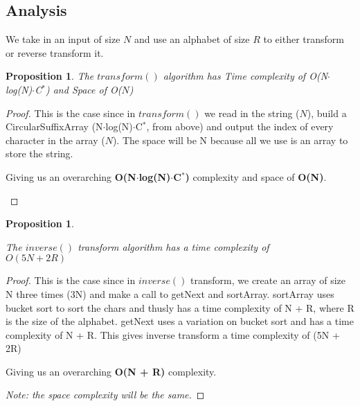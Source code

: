 \documentclass[12pt]{article}
\newtheorem{proposition}[theorem]{Proposition}
\begin{document}
\subsection{Analysis}

We take in an input of size $N$ and use an alphabet of size $R$ to either
transform or reverse transform it.

\begin{proposition}
	\label{numq}
	The $transform()$ algorithm has Time complexity of O(N$\cdot$log(N)$\cdot$C$^{\ast}$) and Space of O($N$)
	
	
\end{proposition}

\begin{proof}
	This is the case since in $transform()$ we read in the string ($N$), build a CircularSuffixArray (N$\cdot$log(N)$\cdot$C$^{\ast}$, from above) and output the index of every character in the array ($N$).
	The space will be N because all we use is an array to store the string. 
	
	
	\begin{center}
		Giving us an overarching \textbf{O(N$\cdot$log(N)$\cdot$C$^{\ast}$)} complexity and space of \textbf{O(N)}.
	\end{center}
	
\end{proof}

\begin{proposition}
	\label{numq}
	
	The $inverse()$ transform algorithm has a time complexity of \\ $O(5N + 2R)$
	
	
\end{proposition}

\begin{proof}
	This is the case since in $inverse()$ transform, we create an array of size N three times (3N) and make a call to getNext and sortArray. sortArray uses
	bucket sort to sort the chars and thusly has a time complexity of N + R,
	where R is the size of the alphabet. getNext uses a variation on bucket
	sort and has a time complexity of N + R. This gives inverse transform
	a time complexity of (5N + 2R)
	
	
	\begin{center}
		Giving us an overarching \textbf{O(N + R)} complexity.
		
		
		
	\end{center}
	\em{Note: the space complexity will be the same.}	
\end{proof}
\end{document}
